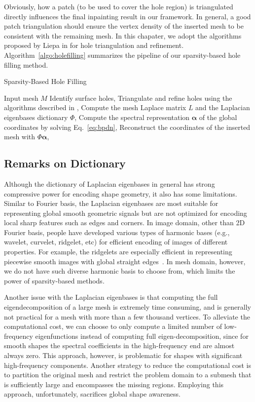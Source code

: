 Obviously, how a patch (to be used to cover the hole region) is
triangulated directly influences the final inpainting result in our
framework. In general, a good patch triangulation should ensure the
vertex density of the inserted mesh to be consistent with the
remaining mesh. In this chapater, we adopt the algorithms proposed by
Liepa in \cite{Liepa2003} for hole triangulation and refinement.
Algorithm~\ref{algo:holefilling} summarizes the pipeline of our
sparsity-based hole filling method.

\begin{algorithm}
\caption{Sparsity-Based Hole Filling}
\label{algo:holefilling}
\begin{algorithmic}[1]
  \REQUIRE Input mesh $M$
\STATE Identify surface holes,
\STATE Triangulate and refine holes using the algorithms described in
  \cite{Liepa2003},
\STATE Compute the mesh Laplace matrix $L$ and the Laplacian eigenbases dictionary $\Phi$,
\STATE Compute the spectral representation $\mathbf{\alpha}$ of the global coordinates by solving Eq.~\ref{eq:bpdn},
\STATE Reconstruct the coordinates of the inserted mesh with $\Phi\mathbf{\alpha}$,
\ENDFOR
\end{algorithmic}
\end{algorithm}


\subsection{Remarks on Dictionary}
\label{seq:remark}
Although the dictionary of Laplacian eigenbases in general has strong compressive power for encoding
shape geometry, it also has some limitations. Similar to Fourier basis, the Laplacian eigenbases
are most suitable for representing global smooth geometric signals but are not optimized for encoding local sharp features
such as edges and corners. In image domain, other than 2D Fourier basis, people have developed various types of harmonic bases
(e.g., wavelet, curvelet, ridgelet, etc) for efficient encoding of images of different properties.
For example, the ridgelets are especially efficient in representing piecewise smooth images with
global straight edges~\cite{Fadili2012}. In mesh domain, however, we do not have such diverse
harmonic basis to choose from, which limits the power of sparsity-based methods.

Another issue with the Laplacian eigenbases is that computing the full eigendecomposition of a large mesh is extremely
time consuming, and is generally not practical for a mesh with more than a few thousand vertices.
To alleviate the computational cost, we can choose to only compute a limited number of low-frequency eigenfunctions
instead of computing full eigen-decomposition, since for smooth shapes the spectral coefficients in the high-frequency end
are almost always zero. This approach, however, is problematic for shapes with significant high-frequency components.
Another strategy to reduce the computational cost is to partition the original mesh and restrict the problem domain to a
submesh that is sufficiently large and encompasses the missing regions. Employing this approach, unfortunately,
sacrifices global shape awareness.


